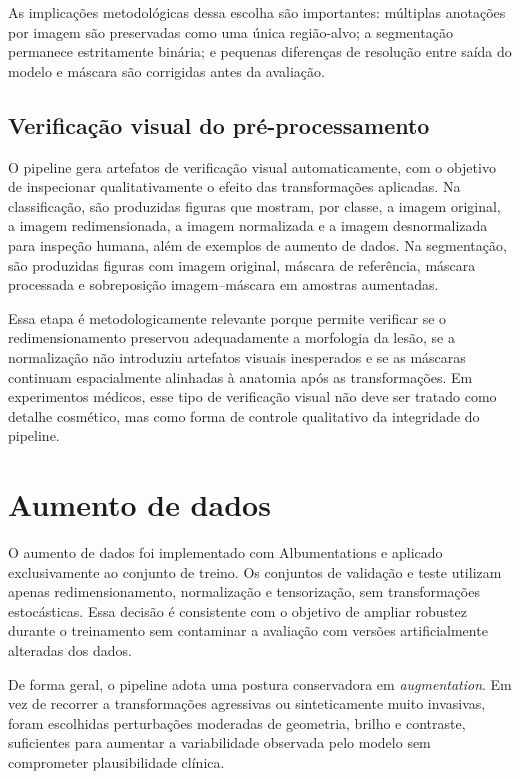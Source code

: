 \documentclass[tcc,capa]{texufpel}
\begin{document}
As implicações metodológicas dessa escolha são importantes: múltiplas anotações por imagem são preservadas como uma única região-alvo; a segmentação permanece estritamente binária; e pequenas diferenças de resolução entre saída do modelo e máscara são corrigidas antes da avaliação.

\subsection{Verificação visual do pré-processamento}

O pipeline gera artefatos de verificação visual automaticamente, com o objetivo de inspecionar qualitativamente o efeito das transformações aplicadas. Na classificação, são produzidas figuras que mostram, por classe, a imagem original, a imagem redimensionada, a imagem normalizada e a imagem desnormalizada para inspeção humana, além de exemplos de aumento de dados. Na segmentação, são produzidas figuras com imagem original, máscara de referência, máscara processada e sobreposição imagem--máscara em amostras aumentadas.

Essa etapa é metodologicamente relevante porque permite verificar se o redimensionamento preservou adequadamente a morfologia da lesão, se a normalização não introduziu artefatos visuais inesperados e se as máscaras continuam espacialmente alinhadas à anatomia após as transformações. Em experimentos médicos, esse tipo de verificação visual não deve ser tratado como detalhe cosmético, mas como forma de controle qualitativo da integridade do pipeline.

\section{Aumento de dados}

O aumento de dados foi implementado com Albumentations e aplicado exclusivamente ao conjunto de treino. Os conjuntos de validação e teste utilizam apenas redimensionamento, normalização e tensorização, sem transformações estocásticas. Essa decisão é consistente com o objetivo de ampliar robustez durante o treinamento sem contaminar a avaliação com versões artificialmente alteradas dos dados.

De forma geral, o pipeline adota uma postura conservadora em \textit{augmentation}. Em vez de recorrer a transformações agressivas ou sinteticamente muito invasivas, foram escolhidas perturbações moderadas de geometria, brilho e contraste, suficientes para aumentar a variabilidade observada pelo modelo sem comprometer plausibilidade clínica.
\end{document}
